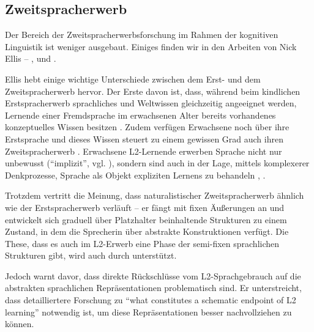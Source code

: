 \subsection{Zweitspracherwerb}
Der Bereich der Zweitspracherwerbsforschung im Rahmen der kognitiven Linguistik ist weniger ausgebaut.
Einiges finden wir in den Arbeiten von Nick Ellis -- \cite{Ellis04}, \cite{Ellis06} und \cite{Ellis08}.

Ellis hebt einige wichtige Unterschiede zwischen dem Erst- und dem Zweitspracherwerb hervor.
Der Erste davon ist, dass, während beim kindlichen Erstspracherwerb sprachliches und Weltwissen gleichzeitig angeeignet werden, Lernende einer Fremdsprache im erwachsenen Alter bereits vorhandenes konzeptuelles Wissen besitzen \cite{Ellis08}.
Zudem verfügen Erwachsene noch über ihre Erstsprache und dieses Wissen steuert zu einem gewissen Grad auch ihren Zweitspracherwerb \cite{Ellis08}.
Erwachsene L2-Lernende erwerben Sprache nicht nur unbewusst (``implizit'', vgl. \cite{Ellis04}), sondern sind auch in der Lage, mittels komplexerer Denkprozesse, Sprache als Objekt expliziten Lernens zu behandeln \cite{Ellis08}, \cite{Ellis04}.

Trotzdem vertritt \cite{Ellis08} die Meinung, dass naturalistischer Zweitspracherwerb ähnlich wie der Erstspracherwerb verläuft --
er fängt mit fixen Äußerungen an und entwickelt sich graduell über Platzhalter beinhaltende Strukturen zu einem Zustand, in dem die Sprecherin über abstrakte Konstruktionen verfügt.
Die These, dass es auch im L2-Erwerb eine Phase der semi-fixen sprachlichen Strukturen gibt, wird auch durch \cite{Eskildsen08} unterstützt.

Jedoch warnt \cite{Eskildsen08} davor, dass direkte Rückschlüsse vom L2-Sprachgebrauch auf die abstrakten sprachlichen Repräsentationen problematisch sind.
Er unterstreicht, dass detailliertere Forschung zu ``what constitutes a schematic endpoint of L2 learning'' notwendig ist, um diese Repräsentationen besser nachvollziehen zu können.


